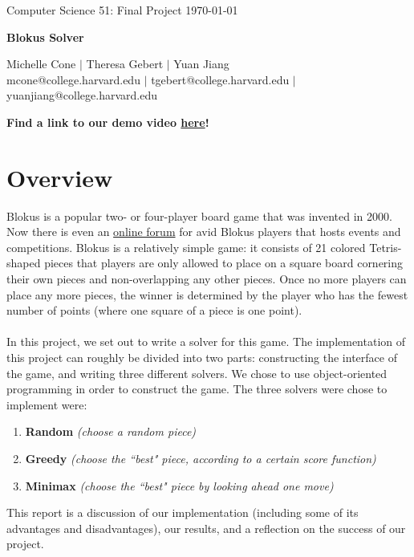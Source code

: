 \documentclass[11pt]{article}
\begin{document}
\doublespacing

\noindent Computer Science 51: Final Project \hfill \today\\
\noindent\makebox[\linewidth]{\rule{6.5in}{2.0pt}}

\begin{center}

\smallskip
{{\LARGE \bf Blokus Solver}}
\smallskip

\noindent\makebox[\linewidth]{\rule{6.5in}{2.0pt}}

\bigskip

{\large Michelle Cone $|$ Theresa Gebert $|$ Yuan Jiang \\
\normalsize mcone@college.harvard.edu $|$ tgebert@college.harvard.edu $|$ yuanjiang@college.harvard.edu} \\

\end{center}

\bigskip


\begin{center} {\bf Find a link to our demo video \href{http://youtu.be/XVqFYVdfPtk}{here}!} \end{center}


\section{Overview}

Blokus is a popular two- or four-player board game that was invented in 2000. Now there is even an \href{http://forum.blokus.refreshed.be/}{online forum} for avid Blokus players that hosts events and competitions. Blokus is a relatively simple game: it consists of 21 colored Tetris-shaped pieces that players are only allowed to place on a square board cornering their own pieces and non-overlapping any other pieces. Once no more players can place any more pieces, the winner is determined by the player who has the fewest number of points (where one square of a piece is one point).
\\\\
In this project, we set out to write a solver for this game. The implementation of this project can roughly be divided into two parts: constructing the interface of the game, and writing three different solvers. We chose to use object-oriented programming in order to construct the game. The three solvers were chose to implement were:
\begin{enumerate}
	\item {\bf Random} {\it (choose a random piece)}
	\item {\bf Greedy} {\it (choose the ``best" piece, according to a certain score function)}
	\item {\bf Minimax} {\it (choose the ``best" piece by looking ahead one move)}
\end{enumerate}
This report is a discussion of our implementation (including some of its advantages and disadvantages), our results, and a reflection on the success of our project.
\end{document}

